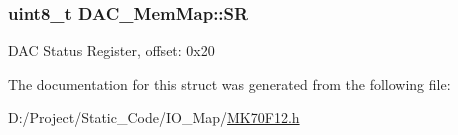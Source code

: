 \subsubsection[{S\+R}]{\setlength{\rightskip}{0pt plus 5cm}uint8\+\_\+t D\+A\+C\+\_\+\+Mem\+Map\+::\+S\+R}\label{struct_d_a_c___mem_map_a146115dd60e5e34ce6f1d8dc2b860877}
D\+A\+C Status Register, offset\+: 0x20 

The documentation for this struct was generated from the following file\+:\begin{DoxyCompactItemize}
\item 
D\+:/\+Project/\+Static\+\_\+\+Code/\+I\+O\+\_\+\+Map/\hyperlink{_m_k70_f12_8h}{M\+K70\+F12.\+h}\end{DoxyCompactItemize}
